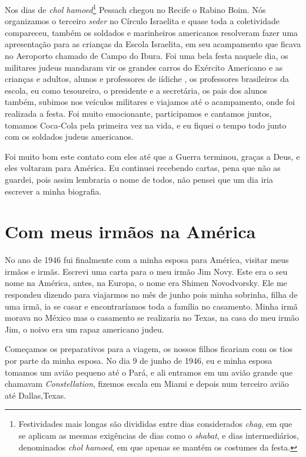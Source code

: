 Nos dias de \textit{chol hamoed}\footnote{Festividades mais longas são divididas
  entre dias considerados \textit{chag}, em que se aplicam as mesmas exigências
  de dias como o \textit{shabat}, e dias intermediários, denominados \textit{chol hamoed},
  em que apenas se mantém os costumes da festa.} Pessach chegou no
Recife o Rabino Boim. Nós organizamos o terceiro \textit{seder} no Círculo
Israelita e quase toda a coletividade compareceu, também os soldados e
marinheiros americanos resolveram fazer uma apresentação para as
crianças da Escola Israelita, em seu acampamento que ficava no Aeroporto
chamado de Campo do Ibura. Foi uma bela festa naquele dia, os militares
judeus mandaram vir os grandes carros do Exército Americano e as
crianças e adultos, alunos e professores de iídiche , os professores
brasileiros da escola, eu como tesoureiro, o presidente e a secretária,
os pais dos alunos também, subimos nos veículos militares e viajamos até
o acampamento, onde foi realizada a festa. Foi muito emocionante,
participamos e cantamos juntos, tomamos Coca-Cola pela primeira vez na
vida, e eu fiquei o tempo todo junto com os soldados judeus americanos.

Foi muito bom este contato com eles até que a Guerra terminou, graças a
Deus, e eles voltaram para América. Eu continuei recebendo cartas, pena
que não as guardei, pois assim lembraria o nome de todos, não pensei que
um dia iria escrever a minha biografia.

\chapter{Com meus irmãos na América}

No ano de 1946 fui finalmente com a minha esposa para América, visitar
meus irmãos e irmãs. Escrevi uma carta para o meu irmão Jim Novy. Este
era o seu nome na América, antes, na Europa, o nome era Shimen
Novodvorsky. Ele me respondeu dizendo para viajarmos no mês de junho
pois minha sobrinha, filha de uma irmã, ia se casar e encontraríamos
toda a família no casamento. Minha irmã morava no México mas o casamento
se realizaria no Texas, na casa do meu irmão Jim, o noivo era um rapaz
americano judeu.

Começamos os preparativos para a viagem, os nossos filhos ficariam com
os tios por parte da minha esposa. No dia 9 de junho de 1946, eu e minha
esposa tomamos um avião pequeno até o Pará, e ali entramos em um avião
grande que chamavam \textit{Constellation}, fizemos escala em Miami e depois num
terceiro avião até Dallas,Texas.

